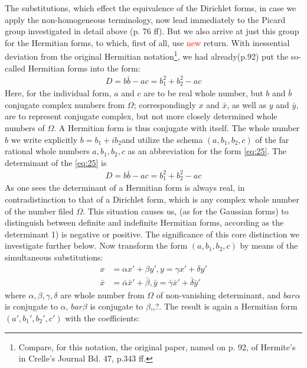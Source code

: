 The substitutions, which effect the equivalence of the Dirichlet forms, in case we apply the non-homogeneous terminology, now lead immediately to the Picard group investigated in detail above (p. 76 ff). But we also arrive at just this group for the Hermitian forms, to which, first of all, use \textcolor{red}{new} return.
With inessential deviation from the original Hermitian notation\footnote{Compare, for this notation, the original paper, named on p. 92, of Hermite's in Crelle's Journal Bd. 47, p.343 ff.}, we had already(p.92) put the so-called Hermitian forms into the form:
\begin{align} \label{eq:25}
D=b\bar{b}-ac=b_{1}^{2}+b_{2}^2-ac
\end{align}
Here, for the individual form, $a$ and $c$ are to be real whole number, but $b$ and $\bar{b}$ conjugate complex numbers from $\Omega$; correspondingly $x$ and $\bar{x}$, as well as $y$ and $\bar{y}$, are to represent conjugate complex, but not more closely determined whole numbers of $\Omega$. A Hermitian form is thus conjugate with itself.
The whole number $b$ we write explicitly $b=b_{1} +i b_{2}$and utilize the schema $(a,b_1,b_2,c)$ of the far rational whole numbers $a,b_1,b_2,c$ as an abbreviation for the form \ref{eq:25}.
The determinant of the \ref{eq:25} is
\begin{align} \label{eq:26}
D=b\bar{b}-ac=b_{1}^{2}+b_{2}^2-ac
\end{align}
As one sees the determinant of a Hermitian form is always real, in contradistinction to that of a Dirichlet form, which is any complex whole number of the number filed $\Omega$. This situation causes us, (as for the Gaussian forms) to distinguish between definite and indefinite Hermitian forms, according as the determinant 1) is negative or positive. The significance of this core distinction we investigate further below.
Now transform the form $(a,b_1,b_2,c)$ by means of the simultaneous substitutions:
\begin{equation}
\begin{split} \label{eq:27}
x &= \alpha x' + \beta y' , y= \gamma x' + \delta y'\\
\bar{x} &= \bar{\alpha}    \bar{x}' + \bar{\beta}, \bar{y}=\bar{\gamma}\bar{x}'+\bar{\delta}\bar{y}'
\end{split}
\end{equation}
where $\alpha,\beta,\gamma, \delta$ are whole number from $\Omega$ of non-vanishing determinant, and $bar{\alpha}$ is conjugate to $\alpha$, $bar{\beta}$ is conjugate to $\beta$,,?. The result is again a Hermitian form $(a',b_{1}',b_{2}',c')$ with the coefficients:

